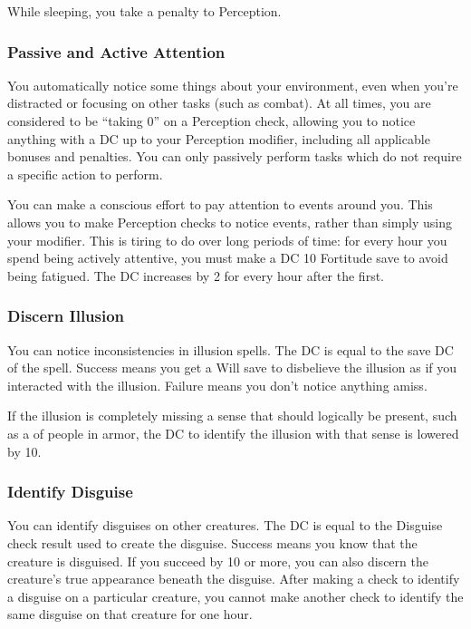 While sleeping, you take a  penalty to Perception.

\subsubsection{Passive and Active Attention}\label{Perception:Passive and Active Attention}
You automatically notice some things about your environment, even when you're distracted or focusing on other tasks (such as combat). At all times, you are considered to be ``taking 0'' on a Perception check, allowing you to notice anything with a DC up to your Perception modifier, including all applicable bonuses and penalties. You can only passively perform tasks which do not require a specific action to perform.

You can make a conscious effort to pay attention to events around you. This allows you to make Perception checks to notice events, rather than simply using your modifier. This is tiring to do over long periods of time: for every hour you spend being actively attentive, you must make a DC 10 Fortitude save to avoid being fatigued. The DC increases by 2 for every hour after the first.

\subsubsection{Discern Illusion}
You can notice inconsistencies in illusion spells. The DC is equal to the save DC of the spell. Success means you get a Will save to disbelieve the illusion as if you interacted with the illusion. Failure means you don't notice anything amiss.

If the illusion is completely missing a sense that should logically be present, such as a  of people in armor, the DC to identify the illusion with that sense is lowered by 10.

\subsubsection{Identify Disguise}
You can identify disguises on other creatures. The DC is equal to the Disguise check result used to create the disguise. Success means you know that the creature is disguised. If you succeed by 10 or more, you can also discern the creature's true appearance beneath the disguise. After making a check to identify a disguise on a particular creature, you cannot make another check to identify the same disguise on that creature for one hour.

